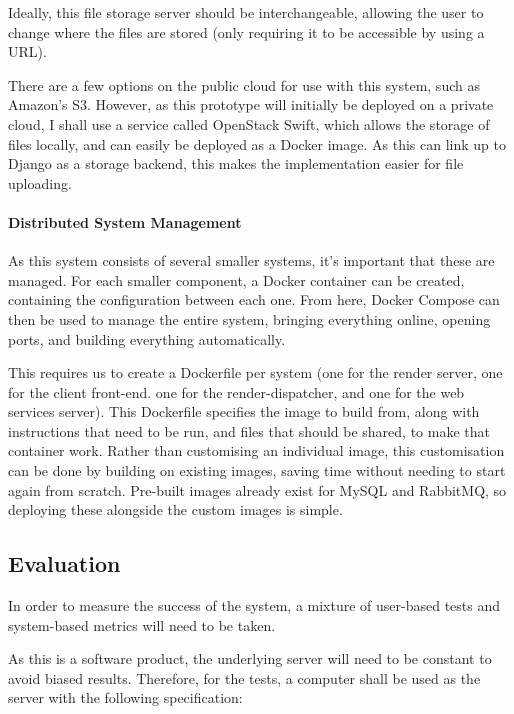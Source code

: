 \documentclass[12pt,a4paper]{article}
\begin{document}
Ideally, this file storage server should be interchangeable, allowing the user to change where the files are stored (only requiring it to be accessible by using a URL).

There are a few options on the public cloud for use with this system, such as Amazon's S3. However, as this prototype will initially be deployed on a private cloud, I shall use a service called OpenStack Swift, which allows the storage of files locally, and can easily be deployed as a Docker image. As this can link up to Django as a storage backend, this makes the implementation easier for file uploading.



\paragraph{Distributed System Management}
As this system consists of several smaller systems, it's important that these are managed. For each smaller component, a Docker container can be created, containing the configuration between each one. From here, Docker Compose can then be used to manage
the entire system, bringing everything online, opening ports, and building everything automatically.

This requires us to create a Dockerfile per system (one for the render server, one for the client front-end. one for the render-dispatcher, and one for the web services server). This Dockerfile specifies the image to build from, along with instructions that need to be run, and files that should be shared, to make that container work. Rather than customising an individual image, this customisation can be done by building on existing images, saving time without needing to start again from scratch. Pre-built images already exist for MySQL and RabbitMQ, so deploying these alongside the custom images is simple. \cite{DockerWhyItsUseful}

\subsection{Evaluation}
In order to measure the success of the system, a mixture of user-based tests and system-based metrics will need to be taken.

As this is a software product, the underlying server will need to be constant to avoid biased results. Therefore, for the tests, a computer shall be used as the server with the following specification:
\end{document}
